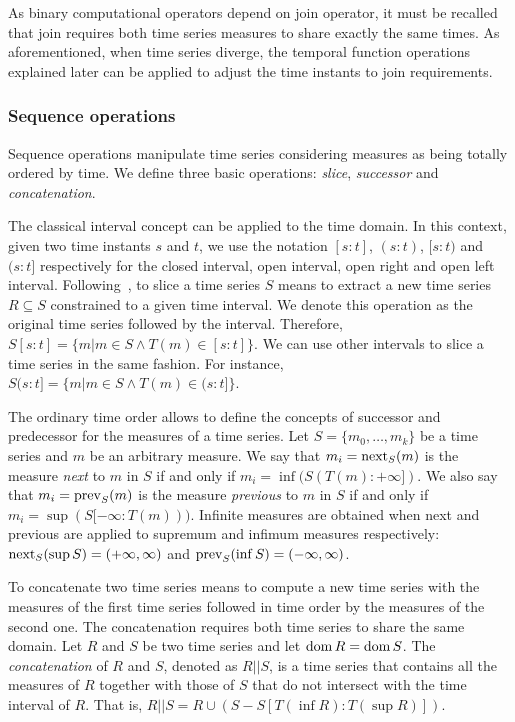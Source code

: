 As binary computational operators depend on join operator, it must be
recalled that join requires both time series measures to share exactly
the same times. As aforementioned, when time series diverge, the
temporal function operations explained later can be applied to adjust
the time instants to join requirements.



\subsubsection{Sequence operations}
\label{sec:sequence}

Sequence operations manipulate time series considering measures as
being totally ordered by time.  We define three basic operations:
\emph{slice}, \emph{successor} and \emph{concatenation}.


The classical interval concept can be applied to the time domain. In this
context, given two time instants $s$ and $t$, we use the notation
$[s:t]$, $(s:t)$, $[s:t)$ and $(s:t]$ respectively for the closed
interval, open interval, open right and open left interval.
%
Following~\cite{last:hetland}, to slice a time series $S$ means to
extract a new time series $R\subseteq S$ constrained to a given time
interval. We denote this operation as the original time series followed
by the interval. Therefore, $S[s:t]=\{m|m\in S \wedge
T(m)\in[s:t]\}$. We can use other intervals to slice a time series in
the same fashion. For instance, $S(s:t]=\{m|m\in S \wedge
T(m)\in(s:t]\}$.

The ordinary time order allows to define the concepts of successor and
predecessor for the measures of a time series.
%
Let $S=\{m_0,\ldots,m_k\}$ be a time series and $m$ be an arbitrary
measure.
%
We say that $m_i=\operatorname*{next}_S(m)$ is the measure \emph{next} to $m$ in $S$
if and only if $m_i=\inf(S(T(m):+\infty])$.
%
We also say that $m_i=\operatorname*{prev}_S(m)$ is the measure \emph{previous} to
$m$ in $S$ if and only if $m_i=\sup(S[-\infty:T(m)))$.
%
Infinite measures are obtained when next and previous are applied to
supremum and infimum measures respectively: $\operatorname*{next}_S(\sup
S)=(+\infty,\infty)$ and $\operatorname*{prev}_S(\inf S)=(-\infty,\infty)$.

To concatenate two time series means to compute a new time series with
the measures of the first time series followed in time order by the
measures of the second one. 
%
The concatenation requires both time series to share the same domain.
Let $R$ and $S$ be two time series and let $\operatorname{dom} R=\operatorname{dom} S$. The
\emph{concatenation} of $R$ and $S$, denoted as $R||S$, is a time
series that contains all the measures of $R$ together with those of
$S$ that do not intersect with the time interval of $R$. That is,
$R||S= R\cup (S - S[T(\inf R):T(\sup R)])$.



